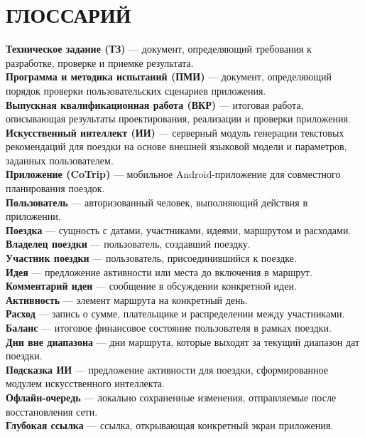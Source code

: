 \documentclass[12pt,a4paper]{article}
\begin{document}
\section*{ГЛОССАРИЙ}
\textbf{Техническое задание (ТЗ)} --- документ, определяющий требования к разработке, проверке и приемке результата.\\
\textbf{Программа и методика испытаний (ПМИ)} --- документ, определяющий порядок проверки пользовательских сценариев приложения.\\
\textbf{Выпускная квалификационная работа (ВКР)} --- итоговая работа, описывающая результаты проектирования, реализации и проверки приложения.\\
\textbf{Искусственный интеллект (ИИ)} --- серверный модуль генерации текстовых рекомендаций для поездки на основе внешней языковой модели и параметров, заданных пользователем.\\
\textbf{Приложение (CoTrip)} --- мобильное Android-приложение для совместного планирования поездок.\\
\textbf{Пользователь} --- авторизованный человек, выполняющий действия в приложении.\\
\textbf{Поездка} --- сущность с датами, участниками, идеями, маршрутом и расходами.\\
\textbf{Владелец поездки} --- пользователь, создавший поездку.\\
\textbf{Участник поездки} --- пользователь, присоединившийся к поездке.\\
\textbf{Идея} --- предложение активности или места до включения в маршрут.\\
\textbf{Комментарий идеи} --- сообщение в обсуждении конкретной идеи.\\
\textbf{Активность} --- элемент маршрута на конкретный день.\\
\textbf{Расход} --- запись о сумме, плательщике и распределении между участниками.\\
\textbf{Баланс} --- итоговое финансовое состояние пользователя в рамках поездки.\\
\textbf{Дни вне диапазона} --- дни маршрута, которые выходят за текущий диапазон дат поездки.\\
\textbf{Подсказка ИИ} --- предложение активности для поездки, сформированное модулем искусственного интеллекта.\\
\textbf{Офлайн-очередь} --- локально сохраненные изменения, отправляемые после восстановления сети.\\
\textbf{Глубокая ссылка} --- ссылка, открывающая конкретный экран приложения.
\end{document}
